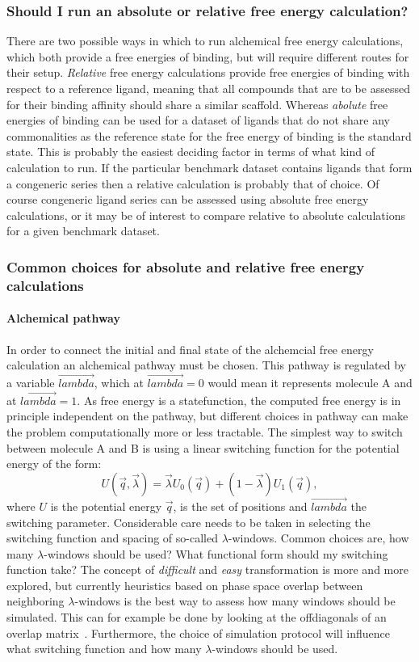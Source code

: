 \documentclass[9pt,bestpractices]{livecoms}
\begin{document}
\subsubsection{Should I run an absolute or relative free energy calculation?}
There are two possible ways in which to run alchemical free energy calculations, which both provide a free energies of binding, but will require different routes for their setup. \textit{Relative} free energy calculations provide free energies of binding with respect to a reference ligand, meaning that all compounds that are to be assessed for their binding affinity should share a similar scaffold. Whereas \textit{abolute} free energies of binding can be used for a dataset of ligands that do not share any commonalities as the reference state for the free energy of binding is the standard state. This is probably the easiest deciding factor in terms of what kind of calculation to run. If the particular benchmark dataset contains ligands that form a congeneric series then a relative calculation is probably that of choice. Of course congeneric ligand series can be assessed using absolute free energy calculations, or it may be of interest to compare relative to absolute calculations for a given benchmark dataset. 
\subsubsection{Common choices for absolute and relative free energy calculations}

\paragraph{Alchemical pathway}
In order to connect the initial and final state of the alchemcial free energy calculation an alchemical pathway must be chosen. This pathway is regulated by a variable $\vec{lambda}$, which at $\vec{lambda}=0$ would mean it represents molecule A and at $\vec{lambda}=1$. As free energy is a statefunction, the computed free energy is in principle independent on the pathway, but different choices in pathway can make the problem computationally more or less tractable. The simplest way to switch between molecule A and B is using a linear switching function for the potential energy of the form:
\begin{equation}
U(\vec{q},\vec{\lambda}) = \vec{\lambda} U_0(\vec{q}) + (1-\vec{\lambda})U_1(\vec{q}),
\end{equation}
where $U$ is the potential energy $\vec{q}$, is the set of positions and $\vec{lambda}$ the switching parameter. Considerable care needs to be taken in selecting the switching function and spacing of so-called $\lambda$-windows. Common choices are, how many $\lambda$-windows should be used? What functional form should my switching function take? The concept of \textit{difficult} and \textit{easy} transformation is more and more explored, but currently heuristics based on phase space overlap between neighboring $\lambda$-windows is the best way to assess how many windows should be simulated. This can for example be done by looking at the offdiagonals of an overlap matrix~\cite{}. Furthermore, the choice of simulation protocol will influence what switching function and how many $\lambda$-windows should be used. 
\end{document}
